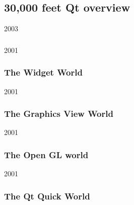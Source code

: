%
%
%
%

\subsection{30,000 feet Qt overview}

\begin{slide}{2003}\frametitle{}
\vspace*{20mm}

\end{slide}


\begin{slide}{2001}\frametitle{The Widget World}

\end{slide}


\begin{slide}{2001}\frametitle{The Graphics View World}

\end{slide}


\begin{slide}{2001}\frametitle{The Open GL world}

\end{slide}


\begin{slide}{2001}\frametitle{The Qt Quick World}
\vspace*{15mm}

\end{slide}

